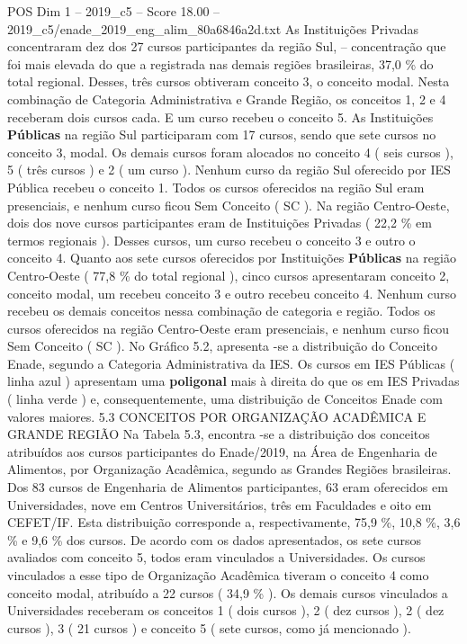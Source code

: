\begin{textsample}{POS Dim 1 – 2019\_c5 – Score 18.00 – 2019\_c5/enade\_2019\_eng\_alim\_80a6846a2d.txt}
As Instituições Privadas concentraram dez dos 27 cursos participantes da região Sul, – concentração que foi mais elevada do que a registrada nas demais regiões brasileiras, 37,0 \% do total regional.
Desses, três cursos obtiveram conceito 3, o conceito modal.
Nesta combinação de Categoria Administrativa e Grande Região, os conceitos 1, 2 e 4 receberam dois cursos cada.
E um curso recebeu o conceito 5.
As Instituições \textbf{Públicas} na região Sul participaram com 17 cursos, sendo que sete cursos no conceito 3, modal.
Os demais cursos foram alocados no conceito 4 ( seis cursos ), 5 ( três cursos ) e 2 ( um curso ).
Nenhum curso da região Sul oferecido por IES Pública recebeu o conceito 1.
Todos os cursos oferecidos na região Sul eram presenciais, e nenhum curso ficou Sem Conceito ( SC ).
Na região Centro-Oeste, dois dos nove cursos participantes eram de Instituições Privadas ( 22,2 \% em termos regionais ).
Desses cursos, um curso recebeu o conceito 3 e outro o conceito 4.
Quanto aos sete cursos oferecidos por Instituições \textbf{Públicas} na região Centro-Oeste ( 77,8 \% do total regional ), cinco cursos apresentaram conceito 2, conceito modal, um recebeu conceito 3 e outro recebeu conceito 4.
Nenhum curso recebeu os demais conceitos nessa combinação de categoria e região.
Todos os cursos oferecidos na região Centro-Oeste eram presenciais, e nenhum curso ficou Sem Conceito ( SC ).
No Gráfico 5.2, apresenta -se a distribuição do Conceito Enade, segundo a Categoria Administrativa da IES.
Os cursos em IES Públicas ( linha azul ) apresentam uma \textbf{poligonal} mais à direita do que os em IES Privadas ( linha verde ) e, consequentemente, uma distribuição de Conceitos Enade com valores maiores. 5.3 CONCEITOS POR ORGANIZAÇÃO ACADÊMICA E GRANDE REGIÃO Na Tabela 5.3, encontra -se a distribuição dos conceitos atribuídos aos cursos participantes do Enade/2019, na Área de Engenharia de Alimentos, por Organização Acadêmica, segundo as Grandes Regiões brasileiras.
Dos 83 cursos de Engenharia de Alimentos participantes, 63 eram oferecidos em Universidades, nove em Centros Universitários, três em Faculdades e oito em CEFET/IF.
Esta distribuição corresponde a, respectivamente, 75,9 \%, 10,8 \%, 3,6 \% e 9,6 \% dos cursos.
De acordo com os dados apresentados, os sete cursos avaliados com conceito 5, todos eram vinculados a Universidades.
Os cursos vinculados a esse tipo de Organização Acadêmica tiveram o conceito 4 como conceito modal, atribuído a 22 cursos ( 34,9 \% ).
Os demais cursos vinculados a Universidades receberam os conceitos 1 ( dois cursos ), 2 ( dez cursos ), 2 ( dez cursos ), 3 ( 21 cursos ) e conceito 5 ( sete cursos, como já mencionado ).

\end{textsample}
